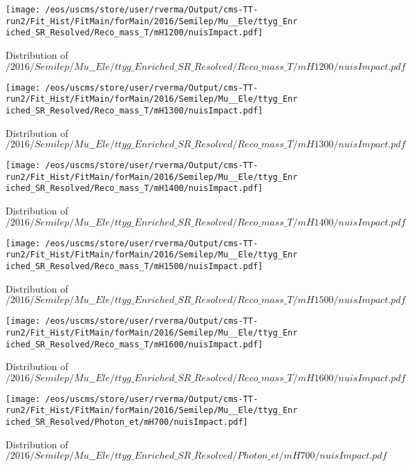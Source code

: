 \begin{figure}
\centering
\texttt{[image: /eos/uscms/store/user/rverma/Output/cms-TT-run2/Fit\_Hist/FitMain/forMain/2016/Semilep/Mu\_\_Ele/ttyg\_Enriched\_SR\_Resolved/Reco\_mass\_T/mH1200/nuisImpact.pdf]}
\caption{Distribution of $/2016/Semilep/Mu\_\_Ele/ttyg\_Enriched\_SR\_Resolved/Reco\_mass\_T/mH1200/nuisImpact.pdf$}
\end{figure}

\begin{figure}
\centering
\texttt{[image: /eos/uscms/store/user/rverma/Output/cms-TT-run2/Fit\_Hist/FitMain/forMain/2016/Semilep/Mu\_\_Ele/ttyg\_Enriched\_SR\_Resolved/Reco\_mass\_T/mH1300/nuisImpact.pdf]}
\caption{Distribution of $/2016/Semilep/Mu\_\_Ele/ttyg\_Enriched\_SR\_Resolved/Reco\_mass\_T/mH1300/nuisImpact.pdf$}
\end{figure}

\begin{figure}
\centering
\texttt{[image: /eos/uscms/store/user/rverma/Output/cms-TT-run2/Fit\_Hist/FitMain/forMain/2016/Semilep/Mu\_\_Ele/ttyg\_Enriched\_SR\_Resolved/Reco\_mass\_T/mH1400/nuisImpact.pdf]}
\caption{Distribution of $/2016/Semilep/Mu\_\_Ele/ttyg\_Enriched\_SR\_Resolved/Reco\_mass\_T/mH1400/nuisImpact.pdf$}
\end{figure}

\begin{figure}
\centering
\texttt{[image: /eos/uscms/store/user/rverma/Output/cms-TT-run2/Fit\_Hist/FitMain/forMain/2016/Semilep/Mu\_\_Ele/ttyg\_Enriched\_SR\_Resolved/Reco\_mass\_T/mH1500/nuisImpact.pdf]}
\caption{Distribution of $/2016/Semilep/Mu\_\_Ele/ttyg\_Enriched\_SR\_Resolved/Reco\_mass\_T/mH1500/nuisImpact.pdf$}
\end{figure}

\begin{figure}
\centering
\texttt{[image: /eos/uscms/store/user/rverma/Output/cms-TT-run2/Fit\_Hist/FitMain/forMain/2016/Semilep/Mu\_\_Ele/ttyg\_Enriched\_SR\_Resolved/Reco\_mass\_T/mH1600/nuisImpact.pdf]}
\caption{Distribution of $/2016/Semilep/Mu\_\_Ele/ttyg\_Enriched\_SR\_Resolved/Reco\_mass\_T/mH1600/nuisImpact.pdf$}
\end{figure}

\begin{figure}
\centering
\texttt{[image: /eos/uscms/store/user/rverma/Output/cms-TT-run2/Fit\_Hist/FitMain/forMain/2016/Semilep/Mu\_\_Ele/ttyg\_Enriched\_SR\_Resolved/Photon\_et/mH700/nuisImpact.pdf]}
\caption{Distribution of $/2016/Semilep/Mu\_\_Ele/ttyg\_Enriched\_SR\_Resolved/Photon\_et/mH700/nuisImpact.pdf$}
\end{figure}


